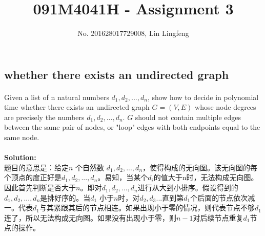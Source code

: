 \documentclass[11pt]{article}
\title{091M4041H - Assignment 3}
\author{No. 201628017729008,  Lin Lingfeng}
\begin{document}
\begin{CJK*}{GBK}{song}
    \maketitle

    \section{whether there exists an undirected graph}

    \paragraph{} Given a list of n natural numbers $d_1, d_2,...,d_n$, show how to decide in polynomial time whether there exists an undirected graph $G = (V, E)$ whose node degrees are precisely the numbers $d_1, d_2,...,d_n$. $G$ should not contain multiple edges between the same pair of nodes, or "loop" edges with both endpoints equal to the same node.

    \paragraph{}\textbf{Solution:}\\
    题目的意思是：给定$n$ 个自然数 $d_1, d_2,...,d_n$，使得构成的无向图。该无向图的每个顶点的度正好是$d_1, d_2,...,d_n$。易知，当某个$d_i$的值大于n时，无法构成无向图。因此首先判断是否大于$n$。即对$d_1, d_2,...,d_n$进行从大到小排序。假设得到的$d_1, d_2,...,d_n$是排好序的。当$d_1$ 小于$n$时，对$d_2, d_3...$直到第$d_1$个后面的节点依次减一。代表$d_1$与其紧跟其后的节点相连。如果出现小于零的情况，则代表节点不够$d_1$连了，所以无法构成无向图。如果没有出现小于零，则$n-1$对后续节点重复$d_1$节点的操作。



\end{CJK*}
\end{document}

